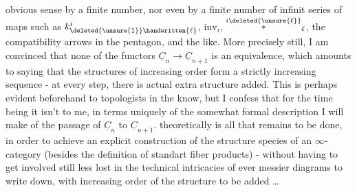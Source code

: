 obvious sense by a finite number, nor even by a finite number of infinit series of maps such as $k_{\deleted{\unsure{1}}\handwritten{\ell}}^i$, $\mathrm{inv}_i$, $\overset{i\deleted{\unsure{\ell}}}{*}_\ell$, the compatibility arrows in the pentagon, and the like. More precisely still, I am convinced that none of the functors $\underline{C}_n\to\underline{C}_{n+1}$ is an equivalence, which amounts to saying that the structures of increasing order form a strictly increasing sequence - at every step, there is actual extra structure added.%
 This is perhaps evident beforehand to topologists in the know, but I confess that for the time being it isn't to me, in terms uniquely of the somewhat formal description I will make of the passage of $\underline{C}_n$ to $\underline{C}_{n+1}$.  theoretically is all that remains to be done, in order to achieve an explicit construction of the  structure species of an \deleted{\unsure{$\infty$}}$\infty$-category (besides the definition of standart fiber products) - without having to get involved still less lost in the technical intricacies of ever messier diagrams to\deleted{\unsure{,}} write down, with increasing order of the structure to be added \ldots

